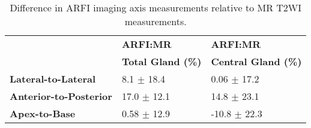 \begin{table}[h!]
\centering
\caption{Difference in ARFI imaging axis measurements relative to MR T2WI measurements.}
\begin{tabular}{|l|l|l|} \hline
 & {\bf ARFI:MR} & {\bf ARFI:MR} \\
 & {\bf Total Gland (\%)} & {\bf Central Gland (\%)} \\ \hline
{\bf Lateral-to-Lateral} & 8.1 $\pm$ 18.4 & 0.06 $\pm$ 17.2 \\
{\bf Anterior-to-Posterior} & 17.0 $\pm$ 12.1 & 14.8 $\pm$ 23.1 \\
{\bf Apex-to-Base} & 0.58 $\pm$ 12.9 & -10.8 $\pm$ 22.3 \\
\hline
\end{tabular}
\label{tab:mr_arfi_axes_error}
\end{table}
